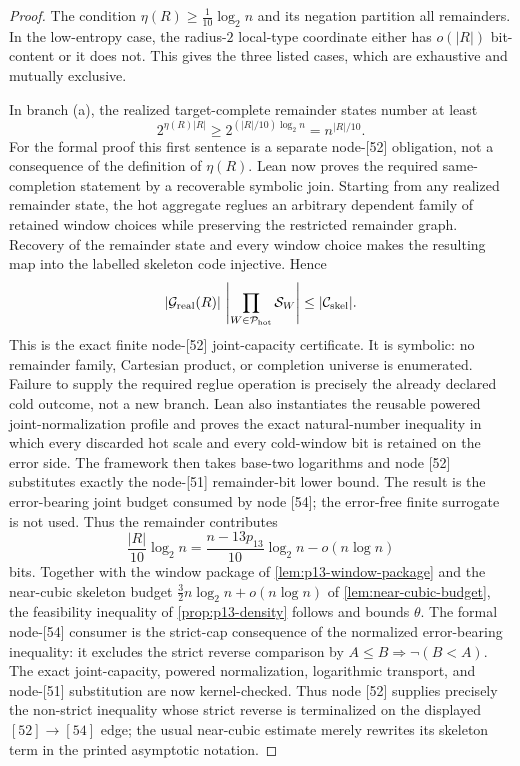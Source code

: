 \documentclass[11pt]{article}
\begin{document}
\begin{proof}
The condition $\eta(R)\ge\frac1{10}\log_2 n$ and its negation partition all
remainders.  In the low-entropy case, the radius-$2$ local-type coordinate
either has $o(|R|)$ bit-content or it does not.  This gives the three listed
cases, which are exhaustive and mutually exclusive.

In branch (a), the realized target-complete remainder states number at least
\[
2^{\eta(R)|R|}
\ge
2^{(|R|/10)\log_2 n}
=
n^{|R|/10}.
\]
For the formal proof this first sentence is a separate node-[52] obligation,
not a consequence of the definition of \(\eta(R)\).  Lean now proves the
required same-completion statement by a recoverable symbolic join.  Starting
from any realized remainder state, the hot aggregate reglues an arbitrary
dependent family of retained window choices while preserving the restricted
remainder graph.  Recovery of the remainder state and every window choice
makes the resulting map into the labelled skeleton code injective.  Hence
\[
 |\mathcal G_{\rm real}(R)|\,
 \left|\prod_{W\in\mathcal P_{\rm hot}}\mathcal S_W\right|
 \le |\mathcal C_{\rm skel}|.
\]
This is the exact finite node-[52] joint-capacity certificate.  It is symbolic:
no remainder family, Cartesian product, or completion universe is enumerated.
Failure to supply the required reglue operation is precisely the already
declared cold outcome, not a new branch.  Lean also instantiates the reusable
powered joint-normalization profile and proves the exact natural-number
inequality in which every discarded hot scale and every cold-window bit is
retained on the error side.  The framework then takes base-two logarithms and
node [52] substitutes exactly the node-[51] remainder-bit lower bound.  The
result is the error-bearing joint budget consumed by node [54]; the
error-free finite surrogate is not used.
Thus the remainder contributes
\[
\frac{|R|}{10}\log_2 n
=
\frac{n-13p_{13}}{10}\log_2 n-o(n\log n)
\]
bits.  Together with the window package of \cref{lem:p13-window-package} and the
near-cubic skeleton budget $\frac32 n\log_2 n+o(n\log n)$ of
\cref{lem:near-cubic-budget}, the feasibility inequality of
\cref{prop:p13-density} follows and bounds $\theta$.
The formal node-[54] consumer is the strict-cap consequence of the normalized
error-bearing inequality: it excludes the strict reverse comparison by
$A\le B\Rightarrow\neg(B<A)$.  The exact joint-capacity, powered
normalization, logarithmic transport, and node-[51] substitution are now
kernel-checked.  Thus node [52] supplies precisely the non-strict inequality
whose strict reverse is terminalized on the displayed $[52]\to[54]$ edge;
the usual near-cubic estimate merely rewrites its skeleton term in the
printed asymptotic notation.


\end{proof}
\end{document}
